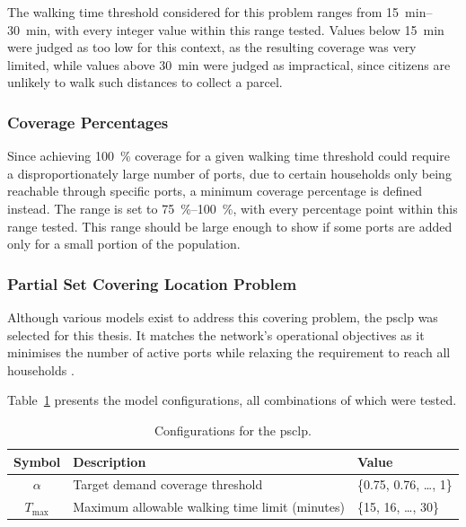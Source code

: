 \documentclass[12pt]{article}
\begin{document}
The walking time threshold considered for this problem ranges from \qtyrange{15}{30}{\minute}, with every integer value within this range tested. Values below \qty{15}{\minute} were judged as too low for this context, as the resulting coverage was very limited, while values above \qty{30}{\minute} were judged as impractical, since citizens are unlikely to walk such distances to collect a parcel.

\subsubsection{Coverage Percentages}
\label{subsubsec:coverage-percentages}

Since achieving \qty{100}{\percent} coverage for a given walking time threshold could require a disproportionately large number of ports, due to certain households only being reachable through specific ports, a minimum coverage percentage is defined instead. The range is set to \qtyrange{75}{100}{\percent}, with every percentage point within this range tested. This range should be large enough to show if some ports are added only for a small portion of the population.

\subsubsection{Partial Set Covering Location Problem}
\label{subsubsec:partial-set-covering-location-problem}

Although various models exist to address this covering problem, the \ac{psclp} was selected for this thesis. It matches the network's operational objectives as it minimises the number of active ports while relaxing the requirement to reach all households \parencite{psclp}.

Table~\ref{tab:psclp_configs} presents the model configurations, all combinations of which were tested.

\begin{table}[htbp]
  \centering
  \caption{Configurations for the \ac{psclp}.}
  \label{tab:psclp_configs}

  \begin{tabularx}{\textwidth}{c X l}
    \toprule
    \textbf{Symbol} & \textbf{Description}                           & \textbf{Value}            \\
    \midrule
    \(\alpha\)      & Target demand coverage threshold               & \{0.75, 0.76, \ldots, 1\} \\
    \(T_{\max}\)    & Maximum allowable walking time limit (minutes) & \{15, 16, \ldots, 30\}    \\
    \bottomrule
  \end{tabularx}
\end{table}
\end{document}
